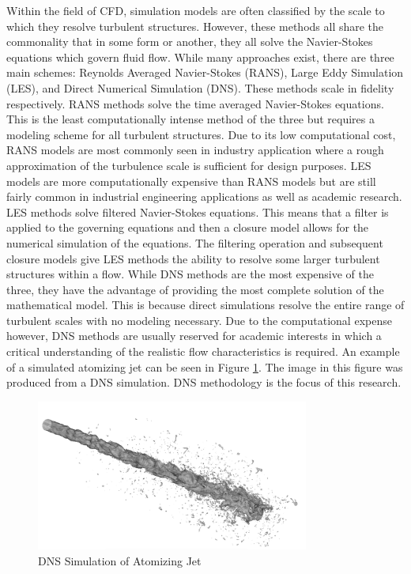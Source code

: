 Within the field of CFD, simulation models are often classified by the scale to which they resolve turbulent structures. However, these methods all share the commonality that in some form or another, they all solve the Navier-Stokes equations which govern fluid flow. While many approaches exist, there are three main schemes: Reynolds Averaged Navier-Stokes (RANS), Large Eddy Simulation (LES), and Direct Numerical Simulation (DNS). These methods scale in fidelity respectively. RANS methods solve the time averaged Navier-Stokes equations. This is the least computationally intense method of the three but requires a modeling scheme for all turbulent structures. Due to its low computational cost, RANS models are most commonly seen in industry application where a rough approximation of the turbulence scale is sufficient for design purposes. LES models are more computationally expensive than RANS models but are still fairly common in industrial engineering applications as well as academic research. LES methods solve filtered Navier-Stokes equations. This means that a filter is applied to the governing equations and then a closure model allows for the numerical simulation of the equations. The filtering operation and subsequent closure models give LES methods the ability to resolve some larger turbulent structures within a flow. While DNS methods are the most expensive of the three, they have the advantage of providing the most complete solution of the mathematical model. This is because direct simulations resolve the entire range of turbulent scales with no modeling necessary. Due to the computational expense however, DNS methods are usually reserved for academic interests in which a critical understanding of the realistic flow characteristics is required. An example of a simulated atomizing jet can be seen in Figure \ref{fig:DNSjet}. The image in this figure was produced from a DNS simulation. DNS methodology is the focus of this research.

\begin{figure}[htbp]
	\centering
	\includegraphics[width=0.8\textwidth]{figs/ACESjet}
	\caption{DNS Simulation of Atomizing Jet}
	\label{fig:DNSjet}
\end{figure}

